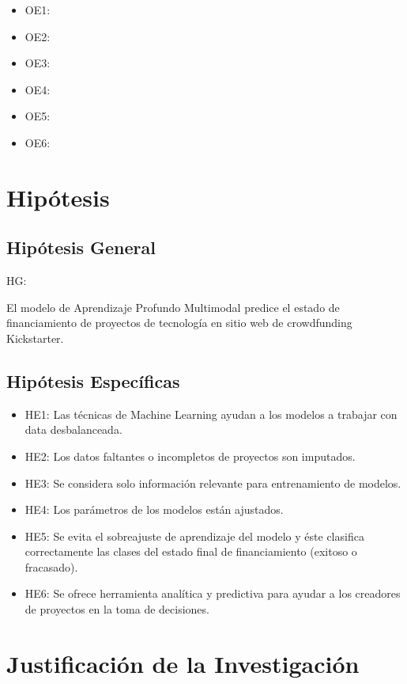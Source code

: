 \begin{itemize}
	\item OE1: {\Objone}
	\item OE2: {\Objtwo}
	\item OE3: {\Objthree}
	\item OE4: {\Objfour}
	\item OE5: {\Objfive}
	\item OE6: {\Objsix}
\end{itemize}

\section{Hipótesis}

\subsection{Hipótesis General}
HG: \newcommand{\HipotesisGeneral}{
	El modelo de Aprendizaje Profundo Multimodal predice el estado de financiamiento de proyectos de tecnología en sitio web de crowdfunding Kickstarter.
}
\HipotesisGeneral
\subsection{Hipótesis Específicas}
\newcommand{\Hone}{
	Las técnicas de Machine Learning ayudan a los modelos a trabajar con data desbalanceada.
}
\newcommand{\Htwo}{
	Los datos faltantes o incompletos de proyectos son imputados.
}
\newcommand{\Hthree}{
	Se considera solo información relevante para entrenamiento de modelos.
}
\newcommand{\Hfour}{
	Los parámetros de los modelos están ajustados.
}
\newcommand{\Hfive}{
	Se evita el sobreajuste de aprendizaje del modelo y éste clasifica correctamente las clases del estado final de financiamiento (exitoso o fracasado).
}
\newcommand{\Hsix}{
	Se ofrece herramienta analítica y predictiva para ayudar a los creadores de proyectos en la toma de decisiones.
}
\begin{itemize}
	\item HE1: \Hone
	\item HE2: \Htwo
	\item HE3: \Hthree
	\item HE4: \Hfour
	\item HE5: \Hfive
	\item HE6: \Hsix
\end{itemize}

\section{Justificación de la Investigación}

